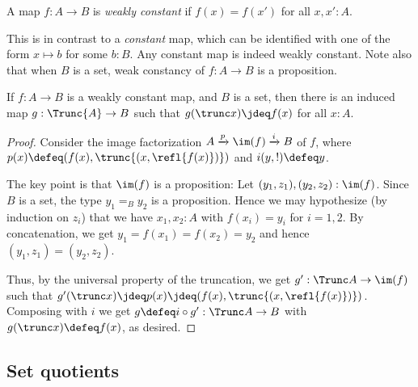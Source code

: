 \begin{definition}
  A map $f: A \to B$ is \emph{weakly constant} if $f(x) = f(x')$ for all $x,x':A$.
\end{definition}
This is in contrast to a \emph{constant} map,
which can be identified with one of the form $x \mapsto b$ for some $b:B$.
Any constant map is indeed weakly constant.
Note also that when $B$ is a set,
weak constancy of $f : A \to B$ is a proposition.

\begin{theorem}\label{thm:wconstant-elim}
  If $f : A \to B$ is a weakly constant map, and $B$ is a set, then
  there is an induced map $g : \Trunc{A} \to B$ such that
  $g(\trunc x)\jdeq f(x)$ for all $x:A$.
\end{theorem}
\begin{proof}
  Consider the image factorization
  $A \xrightarrow{p}{} \im(f) \xrightarrow{i}{} B$ of $f$,
  where $p(x) \defeq (f(x),\trunc{(x,\refl{f(x)})})$
  and $i(y,!) \defeq y$.

  The key point is that $\im(f)$ is a proposition: Let
  $(y_1,z_1),(y_2,z_2):\im(f)$. Since $B$ is a set, the type $y_1=_B
  y_2$ is a proposition. Hence we may hypothesize (by induction on $z_i$)
  that we have $x_1,x_2:A$ with
  $f(x_i) = y_i$ for $i=1,2$. By concatenation, we get
  $y_1=f(x_1)=f(x_2)=y_2$ and hence $(y_1,z_1)=(y_2,z_2)$.

  Thus, by the universal property of the truncation,
  we get $g' : \Trunc A \to \im(f)$ such
  that $g'(\trunc x) \jdeq p(x) \jdeq (f(x),\trunc{(x,\refl{f(x)})})$.
  Composing with $i$ we get $g\defeq i\circ g' : \Trunc A \to B$
  with $g(\trunc x) \defeq f(x)$, as desired.
\end{proof}

\subsection{Set quotients}

